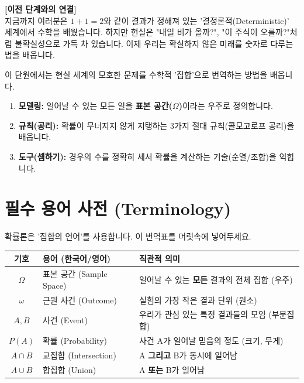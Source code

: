 \documentclass[11pt,a4paper]{book}
\theoremstyle{definition}
\begin{document}
\textbf{[이전 단계와의 연결]} \\
지금까지 여러분은 $1+1=2$와 같이 결과가 정해져 있는 '결정론적(Deterministic)' 세계에서 수학을 배웠습니다. 하지만 현실은 "내일 비가 올까?", "이 주식이 오를까?"처럼 불확실성으로 가득 차 있습니다. 이제 우리는 확실하지 않은 미래를 숫자로 다루는 법을 배웁니다.

\begin{tcolorbox}[colback=subgray, title={\textbf{📌 이 단원의 핵심 개요 (Overview)}}]
이 단원에서는 현실 세계의 모호한 문제를 수학적 '집합'으로 번역하는 방법을 배웁니다.
\begin{enumerate}
    \item \textbf{모델링:} 일어날 수 있는 모든 일을 \textbf{표본 공간($\Omega$)}이라는 우주로 정의합니다.
    \item \textbf{규칙(공리):} 확률이 무너지지 않게 지탱하는 3가지 절대 규칙(콜모고로프 공리)을 배웁니다.
    \item \textbf{도구(셈하기):} 경우의 수를 정확히 세서 확률을 계산하는 기술(순열/조합)을 익힙니다.
\end{enumerate}
\end{tcolorbox}

\section{필수 용어 사전 (Terminology)}
확률론은 '집합의 언어'를 사용합니다. 이 번역표를 머릿속에 넣어두세요.

\begin{center}
\begin{tabular}{|c|l|l|}
\hline
\rowcolor{mainblue!20} \textbf{기호} & \textbf{용어 (한국어/영어)} & \textbf{직관적 의미} \\ \hline
$\Omega$ & 표본 공간 (Sample Space) & 일어날 수 있는 \textbf{모든} 결과의 전체 집합 (우주) \\ \hline
$\omega$ & 근원 사건 (Outcome) & 실험의 가장 작은 결과 단위 (원소) \\ \hline
$A, B$ & 사건 (Event) & 우리가 관심 있는 특정 결과들의 모임 (부분집합) \\ \hline
$P(A)$ & 확률 (Probability) & 사건 A가 일어날 믿음의 정도 (크기, 무게) \\ \hline
$A \cap B$ & 교집합 (Intersection) & A \textbf{그리고} B가 동시에 일어남 \\ \hline
$A \cup B$ & 합집합 (Union) & A \textbf{또는} B가 일어남 \\ \hline
\end{tabular}
\end{center}
\end{document}
